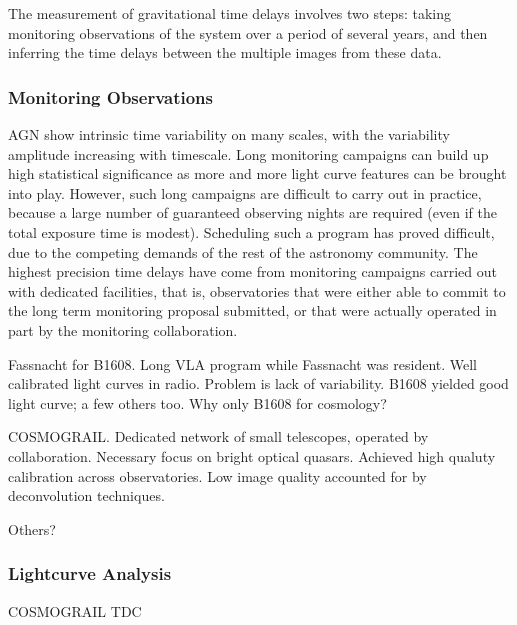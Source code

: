 The measurement of gravitational time delays involves two steps:  taking
monitoring observations of the system over a period of several years,
and then inferring the time delays between the multiple images from
these data.


\subsubsection{Monitoring Observations}

AGN show intrinsic time variability on many scales, with the variability
amplitude increasing  with timescale. Long monitoring campaigns can
build up high statistical  significance as more and more light curve
features can be brought into play.  However, such long campaigns are
difficult to carry out in practice,  because a large number of
guaranteed observing nights are required (even if the total exposure
time is modest). Scheduling such a program has proved difficult, due to
the  competing demands of the rest of the astronomy community. The
highest precision  time delays have come from monitoring campaigns
carried out with dedicated facilities, that is, observatories that were
either able to commit to the long term monitoring proposal submitted, or
that were actually operated in part by the monitoring collaboration.





Fassnacht for B1608. Long VLA program while Fassnacht was resident.
Well calibrated light curves in radio. Problem is lack of variability.
B1608 yielded good light curve; a few others too. Why only B1608 for cosmology?

COSMOGRAIL. Dedicated network of small telescopes, operated by collaboration.
Necessary focus on bright optical quasars. Achieved high qualuty calibration across
observatories. Low image quality accounted for by deconvolution techniques.

Others?


\subsubsection{Lightcurve Analysis}



COSMOGRAIL
TDC
